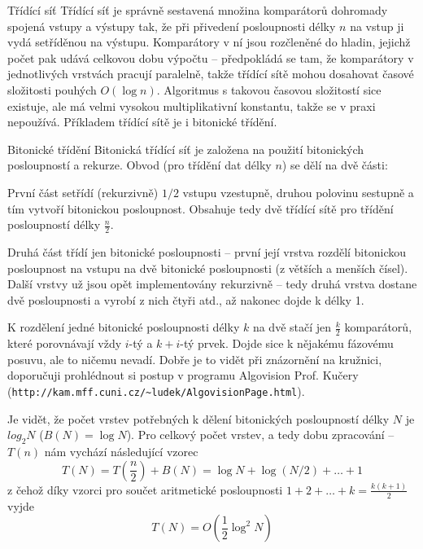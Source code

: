 \begin{definiceN}{Třídící síť}
Třídící síť je správně sestavená množina komparátorů dohromady spojená vstupy a výstupy tak, že při přivedení posloupnosti délky $n$ na vstup ji vydá setříděnou na výstupu. Komparátory v ní jsou rozčleněné do hladin, jejichž počet pak udává celkovou dobu výpočtu -- předpokládá se tam, že komparátory v jednotlivých vrstvách pracují paralelně, takže třídící sítě mohou dosahovat časové složitosti pouhých $O(\log n)$. Algoritmus s takovou časovou složitostí sice existuje, ale má velmi vysokou multiplikativní konstantu, takže se v praxi nepoužívá. Příkladem třídící sítě je i bitonické třídění.
\end{definiceN}

\begin{algoritmusN}{Bitonické třídění}
Bitonická třídící síť je založena na použití bitonických posloupností a rekurze. Obvod (pro třídění dat délky $n$) se dělí na dvě části:
\begin{pitemize}
    \item První část setřídí (rekurzivně) $1/2$ vstupu vzestupně, druhou polovinu sestupně a tím vytvoří bitonickou posloupnost. Obsahuje tedy dvě třídící sítě pro třídění posloupností délky $\frac{n}{2}$.
    \item Druhá část třídí jen bitonické posloupnosti -- první její vrstva rozdělí bitonickou posloupnost na vstupu na dvě bitonické posloupnosti (z větších a menších čísel). Další vrstvy už jsou opět implementovány rekurzivně -- tedy druhá vrstva dostane dvě posloupnosti a vyrobí z nich čtyři atd., až nakonec dojde k  délky 1.
\end{pitemize}

K rozdělení jedné bitonické posloupnosti délky $k$ na dvě stačí jen $\frac{k}{2}$ komparátorů, které porovnávají vždy $i$-tý a $k+i$-tý prvek. Dojde sice k nějakému fázovému posuvu, ale to ničemu nevadí. Dobře je to vidět při znázornění na kružnici, doporučuji prohlédnout si postup v programu Algovision Prof. Kučery (\texttt{http://kam.mff.cuni.cz/\~{}ludek/AlgovisionPage.html}).

Je vidět, že počet vrstev potřebných k dělení bitonických posloupností délky $N$ je $log_2 N$ ($B(N)=\log N$). Pro celkový počet vrstev, a tedy dobu zpracování -- $T(n)$ nám vychází následující vzorec
$$T(N) = T(\frac{n}{2}) + B(N) = \log N + \log(N/2) + \dots + 1$$
z čehož díky vzorci pro součet aritmetické posloupnosti $1+2+\dots+k=\frac{k(k+1)}{2}$ vyjde
$$T(N) = O(\frac{1}{2} \log^2 N)$$
\end{algoritmusN}
